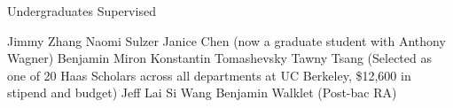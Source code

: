 \begin{rubric}{Undergraduates Supervised}

\entry* Jimmy Zhang
\entry* Naomi Sulzer
\entry* Janice Chen (now a graduate student with Anthony Wagner)
\entry* Benjamin Miron
\entry* Konstantin Tomashevsky
\entry* Tawny Tsang (Selected as one of 20 Haas Scholars across all departments at UC
Berkeley, \$12,600 in stipend and budget)
\entry* Jeff Lai
\entry* Si Wang
\entry* Benjamin Walklet (Post-bac RA)

\end{rubric}
